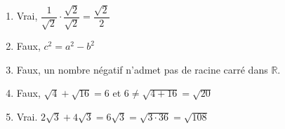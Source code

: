 %
%
    \begin{enumerate}
        \item Vrai, $\dfrac{1}{\sqrt{2}}\cdot\dfrac{\sqrt{2}}{\sqrt{2}} = \dfrac{\sqrt{2}}{2}$
        \item Faux, $c^2 = a^2 - b^2$
        \item Faux, un nombre négatif n'admet pas de racine carré dans $\mathbb{R}$.
        \item Faux, $\sqrt{4} + \sqrt{16} = 6$ et $6\ne \sqrt{4+16}=\sqrt{20}$
        \item Vrai. $2\sqrt{3} + 4\sqrt{3} = 6\sqrt{3} = \sqrt{3\cdot 36} = \sqrt{108}$
    \end{enumerate}
